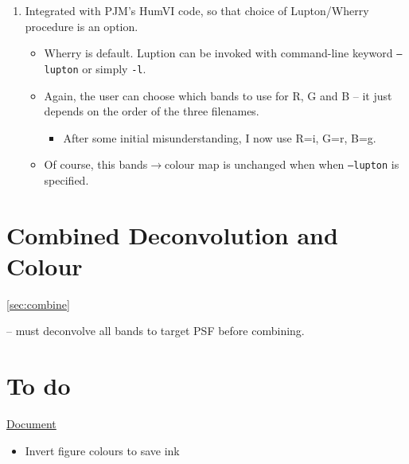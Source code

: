 \documentclass[letterpaper, 11pt]{article}
\def\MORE{{\color{red}{\bf MORE}}\xspace}
\begin{document}
\begin{enumerate}
\begin{itemize}
	\end{itemize}
	\item Integrated with PJM's HumVI code, so that choice of Lupton/Wherry procedure is an option.
	\begin{itemize}
		\item Wherry is default. Luption can be invoked with command-line keyword \texttt{--lupton} or simply \texttt{-l}.
		\item Again, the user can choose which bands to use for R, G and B -- it just depends on the order of the three filenames.
		\begin{itemize}
			\item After some initial misunderstanding, I now use R=i, G=r, B=g.
		\end{itemize}
		\item Of course, this bands$\rightarrow$colour map is unchanged when when \texttt{--lupton} is specified.
	\end{itemize}
\end{enumerate}





\section{Combined Deconvolution and Colour}
\ref{sec:combine}

\citet{MCS98} -- must deconvolve all bands to target PSF before combining.


\newpage
\section{To do}

\underline{Document}
\begin{itemize}
	\item Invert figure colours to save ink
\end{itemize}
\end{document}
